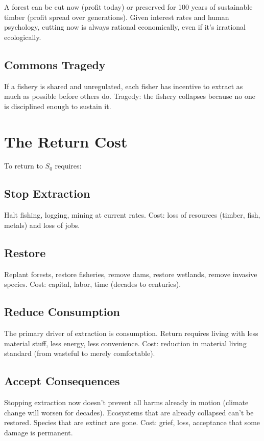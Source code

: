 \documentclass[12pt]{article}
\begin{document}
A forest can be cut now (profit today) or preserved for 100 years of sustainable timber (profit spread over generations). Given interest rates and human psychology, cutting now is always rational economically, even if it's irrational ecologically.

\subsection{Commons Tragedy}

If a fishery is shared and unregulated, each fisher has incentive to extract as much as possible before others do. Tragedy: the fishery collapses because no one is disciplined enough to sustain it.

\section{The Return Cost}

To return to $S_0$ requires:

\subsection{Stop Extraction}

Halt fishing, logging, mining at current rates. Cost: loss of resources (timber, fish, metals) and loss of jobs.

\subsection{Restore}

Replant forests, restore fisheries, remove dams, restore wetlands, remove invasive species. Cost: capital, labor, time (decades to centuries).

\subsection{Reduce Consumption}

The primary driver of extraction is consumption. Return requires living with less material stuff, less energy, less convenience. Cost: reduction in material living standard (from wasteful to merely comfortable).

\subsection{Accept Consequences}

Stopping extraction now doesn't prevent all harms already in motion (climate change will worsen for decades). Ecosystems that are already collapsed can't be restored. Species that are extinct are gone. Cost: grief, loss, acceptance that some damage is permanent.
\end{document}
